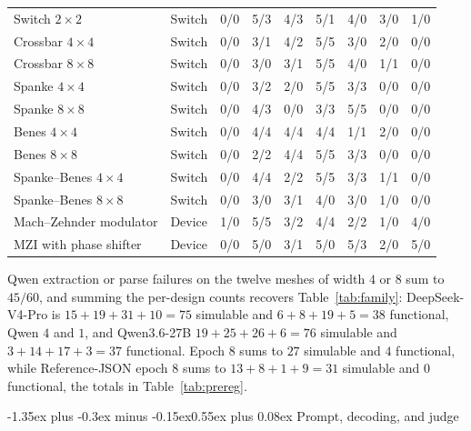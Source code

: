 \documentclass[11pt]{article}
\makeatletter
\renewcommand\section{\@startsection{section}{1}{\z@}%
  {-1.35ex plus -0.3ex minus -0.15ex}{0.55ex plus 0.08ex}%
  {\normalfont\large\bfseries}}
\makeatother
\begin{document}
\begin{table}[H]
\begin{center}
\begin{small}
\begin{tabular}{llccccccc}
\midrule
Switch $2\times2$ & Switch & 0/0 & 5/3 & 4/3 & 5/1 & 4/0 & 3/0 & 1/0 \\
Crossbar $4\times4$ & Switch & 0/0 & 3/1 & 4/2 & 5/5 & 3/0 & 2/0 & 0/0 \\
Crossbar $8\times8$ & Switch & 0/0 & 3/0 & 3/1 & 5/5 & 4/0 & 1/1 & 0/0 \\
Spanke $4\times4$ & Switch & 0/0 & 3/2 & 2/0 & 5/5 & 3/3 & 0/0 & 0/0 \\
Spanke $8\times8$ & Switch & 0/0 & 4/3 & 0/0 & 3/3 & 5/5 & 0/0 & 0/0 \\
Benes $4\times4$ & Switch & 0/0 & 4/4 & 4/4 & 4/4 & 1/1 & 2/0 & 0/0 \\
Benes $8\times8$ & Switch & 0/0 & 2/2 & 4/4 & 5/5 & 3/3 & 0/0 & 0/0 \\
Spanke--Benes $4\times4$ & Switch & 0/0 & 4/4 & 2/2 & 5/5 & 3/3 & 1/1 & 0/0 \\
Spanke--Benes $8\times8$ & Switch & 0/0 & 3/0 & 3/1 & 4/0 & 3/0 & 1/0 & 0/0 \\
\midrule
Mach--Zehnder modulator & Device & 1/0 & 5/5 & 3/2 & 4/4 & 2/2 & 1/0 & 4/0 \\
MZI with phase shifter & Device & 0/0 & 5/0 & 3/1 & 5/0 & 5/3 & 2/0 & 5/0 \\
\bottomrule
\end{tabular}
\end{small}
\end{center}
\end{table}

Qwen extraction or parse failures on the twelve meshes of width $4$ or $8$ sum to $45/60$, and summing the per-design counts recovers Table~\ref{tab:family}: DeepSeek-V4-Pro is $15+19+31+10 = 75$ simulable and $6+8+19+5 = 38$ functional, Qwen $4$ and $1$, and Qwen3.6-27B $19+25+26+6 = 76$ simulable and $3+14+17+3 = 37$ functional.
Epoch 8 sums to $27$ simulable and $4$ functional, while Reference-JSON epoch 8 sums to $13+8+1+9 = 31$ simulable and $0$ functional, the totals in Table~\ref{tab:prereg}.

\section{Prompt, decoding, and judge}
\label{app:prompt}
\end{document}
